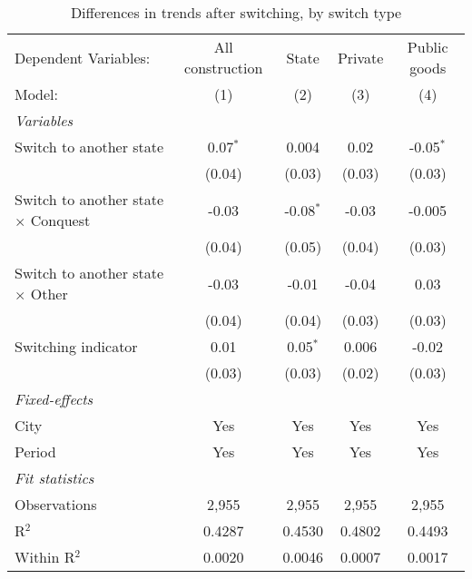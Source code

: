 \begin{table}[htbp]
   \caption{\label{tab:window_100y} Differences in trends after switching, by switch type}
   \centering
   \begin{tabular}{lcccc}
      \tabularnewline \midrule \midrule
      Dependent Variables:                       & All construction & State       & Private & Public goods\\  
      Model:                                     & (1)              & (2)         & (3)     & (4)\\  
      \midrule
      \emph{Variables}\\
      Switch to another state                    & 0.07$^{*}$       & 0.004       & 0.02    & -0.05$^{*}$\\   
                                                 & (0.04)           & (0.03)      & (0.03)  & (0.03)\\   
      Switch to another state $\times$ Conquest  & -0.03            & -0.08$^{*}$ & -0.03   & -0.005\\   
                                                 & (0.04)           & (0.05)      & (0.04)  & (0.03)\\   
      Switch to another state $\times$ Other     & -0.03            & -0.01       & -0.04   & 0.03\\   
                                                 & (0.04)           & (0.04)      & (0.03)  & (0.03)\\   
      Switching indicator                        & 0.01             & 0.05$^{*}$  & 0.006   & -0.02\\   
                                                 & (0.03)           & (0.03)      & (0.02)  & (0.03)\\   
      \midrule
      \emph{Fixed-effects}\\
      City                                       & Yes              & Yes         & Yes     & Yes\\  
      Period                                     & Yes              & Yes         & Yes     & Yes\\  
      \midrule
      \emph{Fit statistics}\\
      Observations                               & 2,955            & 2,955       & 2,955   & 2,955\\  
      R$^2$                                      & 0.4287           & 0.4530      & 0.4802  & 0.4493\\  
      Within R$^2$                               & 0.0020           & 0.0046      & 0.0007  & 0.0017\\  
      \midrule \midrule
      

\end{tabular}
\end{table}
